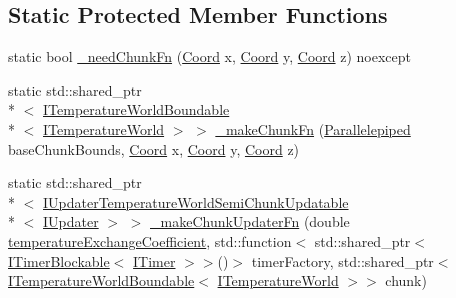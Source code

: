\subsection*{Static Protected Member Functions}
\begin{DoxyCompactItemize}
\item 
static bool \hyperlink{class_scaling_generatable_chunked_temperature_world_injector_ab0567d5d108069282d34c8c729081b15}{\-\_\-need\-Chunk\-Fn} (\hyperlink{struct_coord}{Coord} x, \hyperlink{struct_coord}{Coord} y, \hyperlink{struct_coord}{Coord} z) noexcept
\item 
static std\-::shared\-\_\-ptr\\*
$<$ \hyperlink{class_i_temperature_world_boundable}{I\-Temperature\-World\-Boundable}\\*
$<$ \hyperlink{class_i_temperature_world}{I\-Temperature\-World} $>$ $>$ \hyperlink{class_scaling_generatable_chunked_temperature_world_injector_ac283a716752adf93a706050bad4c4336}{\-\_\-make\-Chunk\-Fn} (\hyperlink{struct_parallelepiped}{Parallelepiped} base\-Chunk\-Bounds, \hyperlink{struct_coord}{Coord} x, \hyperlink{struct_coord}{Coord} y, \hyperlink{struct_coord}{Coord} z)
\item 
static std\-::shared\-\_\-ptr\\*
$<$ \hyperlink{class_i_updater_temperature_world_semi_chunk_updatable}{I\-Updater\-Temperature\-World\-Semi\-Chunk\-Updatable}\\*
$<$ \hyperlink{class_i_updater}{I\-Updater} $>$ $>$ \hyperlink{class_scaling_generatable_chunked_temperature_world_injector_a044df8464cc5df409fbbdc7d14c0c5a6}{\-\_\-make\-Chunk\-Updater\-Fn} (double \hyperlink{class_scaling_generatable_chunked_temperature_world_injector_a30555824cf848c809aceea16d01fc661}{temperature\-Exchange\-Coefficient}, std\-::function$<$ std\-::shared\-\_\-ptr$<$ \hyperlink{class_i_timer_blockable}{I\-Timer\-Blockable}$<$ \hyperlink{class_i_timer}{I\-Timer} $>$$>$()$>$ timer\-Factory, std\-::shared\-\_\-ptr$<$ \hyperlink{class_i_temperature_world_boundable}{I\-Temperature\-World\-Boundable}$<$ \hyperlink{class_i_temperature_world}{I\-Temperature\-World} $>$$>$ chunk)
\end{DoxyCompactItemize}
